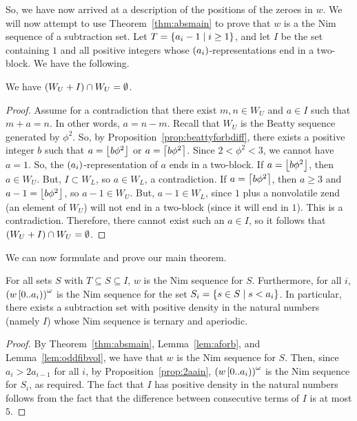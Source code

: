 \documentclass[english,12pt]{article}
\newcommand{\seq}{\p}
\begin{document}
So, we have now arrived at a description of the positions of the zeroes in $w$.  We will now attempt to use Theorem~\ref{thm:absmain} to prove that $w$ is a the Nim sequence of a subtraction set.  Let $T=\left\{a_i-1\mid i\geq1\right\}$, and let $I$ be the set containing $1$ and all positive integers whose $\seq{a_i}$-representations end in a two-block.  We have the following.
\begin{lemma}\label{lem:aforb}
We have $\left(W_U+I\right)\cap W_U=\emptyset$.
\end{lemma}
\begin{proof}
Assume for a contradiction that there exist $m,n\in W_U$ and $a\in I$ such that $m+a=n$.  In other words, $a=n-m$.  Recall that $W_U$ is the Beatty sequence generated by $\phi^2$.  So, by Proposition~\ref{prop:beattyforbdiff}, there exists a positive integer $b$ such that $a=\left\lfloor b\phi^2\right\rfloor$ or $a=\left\lceil b\phi^2\right\rceil$.  Since $2<\phi^2<3$, we cannot have $a=1$.  So, the $\seq{a_i}$-representation of $a$ ends in a two-block.  If $a=\left\lfloor b\phi^2\right\rfloor$, then $a\in W_U$.  But, $I\subset W_L$, so $a\in W_L$, a contradiction.  If $a=\left\lceil b\phi^2\right\rceil$, then $a\geq3$ and $a-1=\left\lfloor b\phi^2\right\rfloor$, so $a-1\in W_U$.  But, $a-1\in W_L$, since $1$ plus a nonvolatile zend (an element of $W_U$) will not end in a two-block (since it will end in $1$).  This is a contradiction.  Therefore, there cannot exist such an $a\in I$, so it follows that $\left(W_U+I\right)\cap W_U=\emptyset$.
\end{proof}

We can now formulate and prove our main theorem.
\begin{theorem}\label{thm:main}
For all sets $S$ with $T\subseteq S\subseteq I$, $w$ is the Nim sequence for $S$.  Furthermore, for all $i$, $\left(w\left[0..a_i\right)\right)^\omega$ is the Nim sequence for the set $S_i=\left\{s\in S\mid s<a_i\right\}$.  In particular, there exists a subtraction set with positive density in the natural numbers (namely $I$) whose Nim sequence is ternary and aperiodic.
\end{theorem}
\begin{proof}
By Theorem~\ref{thm:absmain}, Lemma~\ref{lem:aforb}, and Lemma~\ref{lem:oddfibvol}, we have that $w$ is the Nim sequence for $S$.  Then, since $a_i>2a_{i-1}$ for all $i$, by Proposition~\ref{prop:2aain}, $\left(w\left[0..a_i\right)\right)^\omega$ is the Nim sequence for $S_i$, as required.  The fact that $I$ has positive density in the natural numbers follows from the fact that the difference between consecutive terms of $I$ is at most $5$.
\end{proof}
\end{document}
